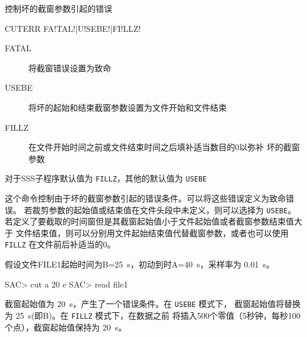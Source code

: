 \label{cmd:cuterr}

控制坏的截窗参数引起的错误

\begin{SACSTX}
CUTERR FA!TAL!|U!SEBE!|FI!LLZ!
\end{SACSTX}

\begin{description}
\item [FATAL] 将截窗错误设置为致命
\item [USEBE] 将坏的起始和结束截窗参数设置为文件开始和文件结束
\item [FILLZ] 在文件开始时间之前或文件结束时间之后填补适当数目的0以弥补
    坏的截窗参数
\end{description}

对于SSS子程序默认值为 \texttt{FILLZ}，其他的默认值为 \texttt{USEBE}

这个命令控制由于坏的截窗参数引起的错误条件。可以将这些错误定义为致命错误。
若裁剪参数的起始值或结束值在文件头段中未定义，则可以选择为 \texttt{USEBE}。
若定义了要截取的时间窗但是其截窗起始值小于文件起始值或者截窗参数结束值大于
文件结束值，则可以分别用文件起始结束值代替截窗参数，或者也可以使用
\texttt{FILLZ} 在文件前后补适当的0。

假设文件FILE1起始时间为B=\SI{25}{s}，初动到时A=\SI{40}{s}，采样率为 \SI{0.01}{s}。
\begin{SACCode}
SAC> cut a 20 e
SAC> read file1
\end{SACCode}
截窗起始值为 \SI{20}{s}，产生了一个错误条件。在 \texttt{USEBE} 模式下，
截窗起始值将替换为 \SI{25}{s}(即B)。在 \texttt{FILLZ} 模式下，在数据之前
将插入500个零值（5秒钟，每秒100个点），截窗起始值保持为 \SI{20}{s}。
